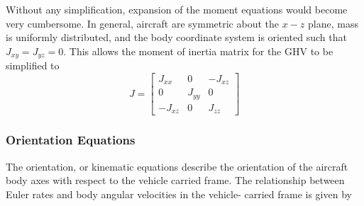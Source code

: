 Without any simplification, expansion of the moment equations would become very cumbersome.
In general, aircraft are symmetric about the $x-z$ plane, mass is uniformly distributed, and the body coordinate system is oriented such that $J_{xy}=J_{yz}=0$.
This allows the moment of inertia matrix for the GHV to be simplified to
\begin{equation}
  J=
  \begin{bmatrix}
    J_{xx} & 0 & -J_{xz} \\
    0 & J_{yy} & 0 \\
    -J_{xz} & 0 & J_{zz}
  \end{bmatrix}
\end{equation}

\subsubsection*{Orientation Equations}

The orientation, or kinematic equations describe the orientation of the aircraft body axes with respect to the vehicle carried frame.
The relationship between Euler rates and body angular velocities in the vehicle- carried frame is given by

